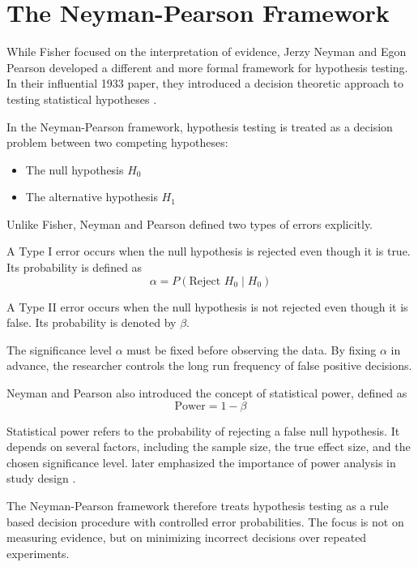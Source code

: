 \section{The Neyman-Pearson Framework}

While Fisher focused on the interpretation of evidence, Jerzy Neyman and Egon Pearson developed a different and more formal framework for hypothesis testing. In their influential 1933 paper, they introduced a decision theoretic approach to testing statistical hypotheses \cite{NeymanPearson1933}.

In the Neyman-Pearson framework, hypothesis testing is treated as a decision problem between two competing hypotheses:
\begin{itemize}
	\item The null hypothesis $H_0$
	\item The alternative hypothesis $H_1$
\end{itemize}

Unlike Fisher, Neyman and Pearson defined two types of errors explicitly.

A Type I error occurs when the null hypothesis is rejected even though it is true. Its probability is defined as
\begin{equation}
	\alpha = P(\text{Reject } H_0 \mid H_0)
\end{equation}

A Type II error occurs when the null hypothesis is not rejected even though it is false. Its probability is denoted by $\beta$.

The significance level $\alpha$ must be fixed before observing the data. By fixing $\alpha$ in advance, the researcher controls the long run frequency of false positive decisions.

Neyman and Pearson also introduced the concept of statistical power, defined as
\begin{equation}
	\text{Power} = 1 - \beta
\end{equation}

Statistical power refers to the probability of rejecting a false null hypothesis\cite{Aberson2015}. It depends on several factors, including the sample size, the true effect size, and the chosen significance level. \cite{Cohen1988} later emphasized the importance of power analysis in study design .

The Neyman-Pearson framework therefore treats hypothesis testing as a rule based decision procedure with controlled error probabilities. The focus is not on measuring evidence, but on minimizing incorrect decisions over repeated experiments.



